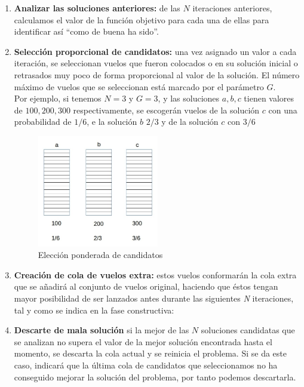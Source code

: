 \begin{enumerate}
	\item \textbf{Analizar las soluciones anteriores:} de las $N$ iteraciones anteriores, calculamos el valor de la función objetivo para cada una de ellas para identificar así ``como de buena ha sido''.
	
	\item \textbf{Selección proporcional de candidatos:} una vez asignado un valor a cada iteración, se seleccionan vuelos que fueron colocados o en su solución inicial o retrasados muy poco de forma proporcional al valor de la solución. El número máximo de vuelos que se seleccionan está marcado por el parámetro $G$.\\
	
	Por ejemplo, si tenemos $N=3$ y $G=3$, y las soluciones $a,b,c$ tienen valores de $100,200,300$ respectivamente, se escogerán vuelos de la solución $c$ con una probabilidad de $1/6$, e la solución $b$ $2/3$ y de la solución $c$ con $3/6$
	\begin{figure}[H]
		\begin{center}
			\centering
			\includegraphics[width=0.5\textwidth]{./imagenes/heuristico/valorSoluciones.jpg}
			\caption{Elección ponderada de candidatos}
			\label{fig: Elección ponderada de candidatos}
		\end{center}
	\end{figure}
	
	\item \textbf{Creación de cola de vuelos extra:} estos vuelos conformarán la cola extra que se añadirá al conjunto de vuelos original, haciendo que éstos tengan mayor posibilidad de ser lanzados antes durante las siguientes \textit{N} iteraciones, tal y como se indica en la fase constructiva:
	
	\item \textbf{Descarte de mala solución} si la mejor de las $N$ soluciones candidatas que se analizan no supera el valor de la mejor solución encontrada hasta el momento, se descarta la cola actual y se reinicia el problema.
	Si se da este caso, indicará que la última cola de candidatos que seleccionamos no ha conseguido mejorar la solución del problema, por tanto podemos descartarla.
\end{enumerate}


